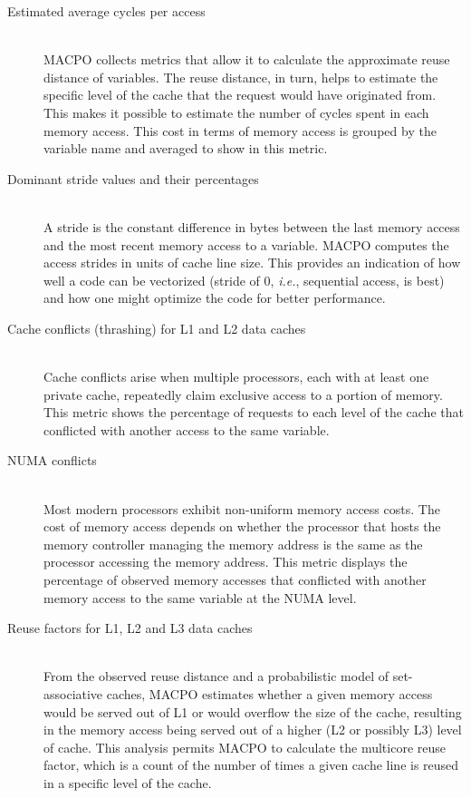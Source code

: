 \begin{description}
	\item[Estimated average cycles per access]\hfill \\
	MACPO collects metrics that allow it to calculate the approximate reuse distance of variables. The reuse distance, in turn, helps to estimate the specific level of the cache that the request would have originated from. This makes it possible to estimate the number of cycles spent in each memory access. This cost in terms of memory access is grouped by the variable name and averaged to show in this metric.

	\item[Dominant stride values and their percentages]\hfill \\
	A stride is the constant difference in bytes between the last memory access and the most recent memory access to a variable. MACPO computes the access strides in units of cache line size. This provides an indication of how well a code can be vectorized (stride of 0, \textit{i.e.}, sequential access, is best) and how one might optimize the code for better performance.

	\item[Cache conflicts (thrashing) for L1 and L2 data caches]\hfill \\
	Cache conflicts arise when multiple processors, each with at least one private cache, repeatedly claim exclusive access to a portion of memory. This metric shows the percentage of requests to each level of the cache that conflicted with another access to the same variable.

	\item[NUMA conflicts]\hfill \\
	Most modern processors exhibit non-uniform memory access costs. The cost of memory access depends on whether the processor that hosts the memory controller managing the memory address is the same as the processor accessing the memory address. This metric displays the percentage of observed memory accesses that conflicted with another memory access to the same variable at the NUMA level.

	\item[Reuse factors for L1, L2 and L3 data caches]\hfill \\
	From the observed reuse distance and a probabilistic model of set-associative caches, MACPO estimates whether a given memory access would be served out of L1 or would overflow the size of the cache, resulting in the memory access being served out of a higher (L2 or possibly L3) level of cache. This analysis permits MACPO to calculate the multicore reuse factor, which is a count of the number of times a given cache line is reused in a specific level of the cache.
\end{description}


